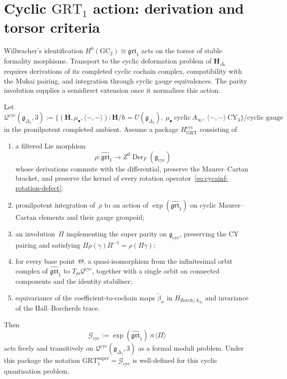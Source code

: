 \section{Cyclic \texorpdfstring{$\mathrm{GRT}_1$}{GRT-1} action:
derivation and torsor criteria}
\label{sec:cycainf-grt1-action}

Willwacher's identification
$H^0(\mathrm{GC}_2)\cong\mathfrak{grt}_1$ acts on the torsor of stable
formality morphisms.  Transport to the cyclic deformation problem of
$\mathbf H_{\Delta_5}$ requires derivations of its completed cyclic
cochain complex, compatibility with the Mukai pairing, and integration
through cyclic gauge equivalences.  The parity involution supplies a
semidirect extension once it normalises this action.

\begin{theorem}
\label{thm:cycainf-grt1-torsor}
Let
\[
 \mathcal Q^{\mathrm{cyc}}(\mathfrak g_{\Delta_5},3)
 :=
 \bigl\{(\mathbf H,\mu_\bullet,\langle-,-\rangle):
 \mathbf H/\hbar=U(\mathfrak g_{\Delta_5}),\
 \mu_\bullet\ \text{cyclic}\ A_\infty,\
 \langle-,-\rangle\ \mathrm{CY}_3\bigr\}
 \big/\text{cyclic gauge}
\]
in the pronilpotent completed ambient.  Assume a package
$H_{\mathrm{GRT}}^{\mathrm{cyc}}$ consisting of
\begin{enumerate}[label=\textup{(\roman*)}]
\item a filtered Lie morphism
\[
 \rho\colon\widehat{\mathfrak{grt}}_1
 \longrightarrow
 Z^0\operatorname{Der}_F(\mathfrak g_{\mathrm{cyc}})
\]
whose derivations commute with the differential, preserve the
Maurer--Cartan bracket, and preserve the kernel of every rotation
operator~\eqref{eq:cycainf-rotation-defect};
\item pronilpotent integration of~$\rho$ to an action of
$\exp(\widehat{\mathfrak{grt}}_1)$ on cyclic Maurer--Cartan elements
and their gauge groupoid;
\item an involution~$\Pi$ implementing the super parity on
$\mathfrak g_{\mathrm{cyc}}$, preserving the CY pairing and satisfying
$\Pi\rho(\gamma)\Pi^{-1}=\rho(\Pi\gamma)$;
\item for every base point~$\Theta$, a quasi-isomorphism from the
infinitesimal orbit complex of
$\widehat{\mathfrak{grt}}_1$ to
$T_\Theta\mathcal Q^{\mathrm{cyc}}$, together with a single orbit on
connected components and the identity stabiliser;
\item equivariance of the coefficient-to-cochain maps
$\widetilde\beta_n$ in $H_{\mathrm{Borch}/A_\infty}$ and invariance of the
Hall--Borcherds trace.
\end{enumerate}
Then
\[
 \mathcal G_{\mathrm{cyc}}
 :=
 \exp(\widehat{\mathfrak{grt}}_1)\rtimes\langle\Pi\rangle
\]
acts freely and transitively on
$\mathcal Q^{\mathrm{cyc}}(\mathfrak g_{\Delta_5},3)$ as a formal
moduli problem.  Under this package the notation
$\mathrm{GRT}_1^{\mathrm{super}}=\mathcal G_{\mathrm{cyc}}$ is
well-defined for this cyclic quantisation problem.
\end{theorem}

